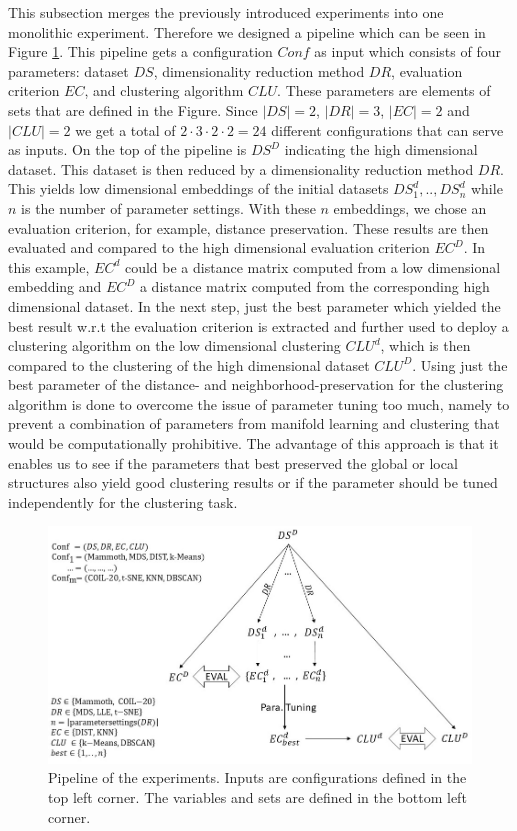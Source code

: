This subsection merges the previously introduced experiments into one monolithic experiment. Therefore we designed a pipeline which can be seen in Figure \ref{fig:pipeline}. This pipeline gets a configuration $Conf$ as input which consists of four parameters: dataset $DS$, dimensionality reduction method $DR$, evaluation criterion $EC$, and clustering algorithm $CLU$. These parameters are elements of sets that are defined in the Figure. Since $|DS|=2$, $|DR|=3$, $|EC|=2$ and $|CLU|=2$ we get a total of $2 \cdot 3 \cdot 2 \cdot 2=24$ different configurations that can serve as inputs.
On the top of the pipeline is $DS^D$ indicating the high dimensional dataset. This dataset is then reduced by a dimensionality reduction method $DR$. This yields low dimensional embeddings of the initial datasets $DS_1^d, .., DS_n^d$ while $n$ is the number of parameter settings. With these $n$ embeddings, we chose an evaluation criterion, for example, distance preservation. These results are then evaluated and compared to the high dimensional evaluation criterion $EC^D$. In this example, $EC^d$ could be a distance matrix computed from a low dimensional embedding and $EC^D$ a distance matrix computed from the corresponding high dimensional dataset. In the next step, just the best parameter which yielded the best result w.r.t the evaluation criterion is extracted and further used to deploy a clustering algorithm on the low dimensional clustering $CLU^d$, which is then compared to the clustering of the high dimensional dataset $CLU^D$. Using just the best parameter of the distance- and neighborhood-preservation for the clustering algorithm is done to overcome the issue of parameter tuning too much, namely to prevent a combination of parameters from manifold learning and clustering that would be computationally prohibitive. The advantage of this approach is that it enables us to see if the parameters that best preserved the global or local structures also yield good clustering results or if the parameter should be tuned independently for the clustering task.

\begin{figure}[!]
	\centering
	\includegraphics[width=1\columnwidth]{images/pipeline_final.jpg}
	\caption[Experimental Pipeline]{Pipeline of the experiments. Inputs are configurations defined in the top left corner. The variables and sets are defined in the bottom left corner.}
    \label{fig:pipeline}
\end{figure}

